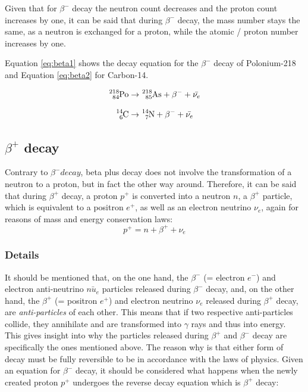 Given that for $\beta^-$ decay the neutron count decreases and the proton count increases by one, it can be said that during $\beta^-$ decay, the mass number stays the same, as a neutron is exchanged for a proton, while the atomic / proton number increases by one.

Equation \ref{eq:beta1} shows the decay equation for the $\beta^-$ decay of Polonium-218 and Equation \ref{eq:beta2} for Carbon-14.

\begin{equation}
  \ce{^{218}_{84}Po} \rightarrow \ce{^{218}_{85}As} + \beta^- + \bar{\nu_{e}}
  \label{eq:beta1}
\end{equation}

\begin{equation}
  \ce{^{14}_{6}C} \rightarrow \ce{^{14}_{7}N} + \beta^- + \bar{\nu_{e}}
  \label{eq:beta2}
\end{equation}

\subsection*{$\beta^+$ decay}

Contrary to $\beta^- decay$, beta plus decay does not involve the transformation of a neutron to a proton, but in fact the other way around. Therefore, it can be said that during $\beta^+$ decay, a proton $p^+$ is converted into a neutron $n$, a $\beta^+$ particle, which is equivalent to a positron $e^+$, as well as an electron neutrino $\nu_{e}$, again for reasons of mass and energy conservation laws: $$p^+ = n + \beta^+ + \nu_{e}$$

\subsubsection*{Details}

It should be mentioned that, on the one hand, the $\beta^-$ (= electron $e^-$) and electron anti-neutrino $\bar{nu_{e}}$ particles released during $\beta^-$ decay, and, on the other hand, the $\beta^+$ (= positron $e^+$) and electron neutrino $\nu_{e}$ released during $\beta^+$ decay, are \emph{anti-particles} of each other. This means that if two respective anti-particles collide, they annihilate and are transformed into $\gamma$ rays and thus into energy. This gives insight into why the particles released during $\beta^+$ and $\beta^-$ decay are specifically the ones mentioned above. The reason why is that either form of decay must be fully reversible to be in accordance with the laws of physics. Given an equation for $\beta^-$ decay, it should be considered what happens when the newly created proton $p^+$ undergoes the reverse decay equation which is $\beta^+$ decay: 

